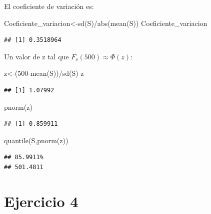 \documentclass[
]{article}
\newenvironment{Shaded}{\begin{snugshade}}{\end{snugshade}}
\newcommand{\DecValTok}[1]{\textcolor[rgb]{0.00,0.00,0.81}{#1}}
\newcommand{\FunctionTok}[1]{\textcolor[rgb]{0.00,0.00,0.00}{#1}}
\newcommand{\NormalTok}[1]{#1}
\newcommand{\OtherTok}[1]{\textcolor[rgb]{0.56,0.35,0.01}{#1}}
\newcommand{\SpecialCharTok}[1]{\textcolor[rgb]{0.00,0.00,0.00}{#1}}
\begin{document}
El coeficiente de variación es:

\begin{Shaded}
\begin{Highlighting}[]
\NormalTok{Coeficiente\_variacion}\OtherTok{\textless{}{-}}\FunctionTok{sd}\NormalTok{(S)}\SpecialCharTok{/}\FunctionTok{abs}\NormalTok{(}\FunctionTok{mean}\NormalTok{(S))}
\NormalTok{Coeficiente\_variacion}
\end{Highlighting}
\end{Shaded}

\begin{verbatim}
## [1] 0.3518964
\end{verbatim}

Un valor de z tal que \(F_s(500)\approx \Phi (z)\):

\begin{Shaded}
\begin{Highlighting}[]
\NormalTok{z}\OtherTok{\textless{}{-}}\NormalTok{(}\DecValTok{500}\SpecialCharTok{{-}}\FunctionTok{mean}\NormalTok{(S))}\SpecialCharTok{/}\FunctionTok{sd}\NormalTok{(S)}
\NormalTok{z}
\end{Highlighting}
\end{Shaded}

\begin{verbatim}
## [1] 1.07992
\end{verbatim}

\begin{Shaded}
\begin{Highlighting}[]
\FunctionTok{pnorm}\NormalTok{(z)}
\end{Highlighting}
\end{Shaded}

\begin{verbatim}
## [1] 0.859911
\end{verbatim}

\begin{Shaded}
\begin{Highlighting}[]
\FunctionTok{quantile}\NormalTok{(S,}\FunctionTok{pnorm}\NormalTok{(z))}
\end{Highlighting}
\end{Shaded}

\begin{verbatim}
## 85.9911% 
## 501.4811
\end{verbatim}

\hypertarget{ejercicio-4}{%
\section{Ejercicio 4}\label{ejercicio-4}}
\end{document}
